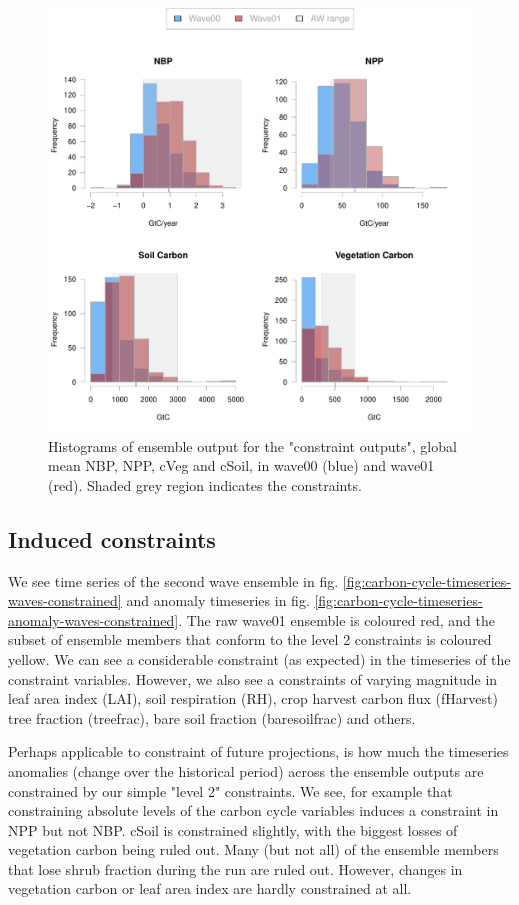 \documentclass[gmd, manuscript]{copernicus}
\begin{document}
\begin{figure}[t]
\includegraphics[width=12cm]{./figs/level_2_constraints_hists.pdf}
\caption{Histograms of ensemble output for the "constraint outputs", global mean NBP, NPP, cVeg and cSoil, in wave00 (blue) and wave01 (red). Shaded grey region indicates the constraints.}
\label{fig:level_2_constraints_hists}
\end{figure}
 
\subsection{Induced constraints}\label{ssec:induced_constraints}

We see time series of the second wave ensemble in fig. \ref{fig:carbon-cycle-timeseries-waves-constrained} and anomaly timeseries in fig. \ref{fig:carbon-cycle-timeseries-anomaly-waves-constrained}. The raw wave01 ensemble is coloured red, and the subset of ensemble members that conform to the level 2 constraints is coloured yellow. We can see a considerable constraint (as expected) in the timeseries of the constraint variables. However, we also see a constraints of varying magnitude in leaf area index (LAI), soil respiration (RH), crop harvest carbon flux (fHarvest) tree fraction (treefrac), bare soil fraction (baresoilfrac) and others.

Perhaps applicable to constraint of future projections, is how much the timeseries anomalies (change over the historical period) across the ensemble outputs are constrained by our simple "level 2" constraints. We see, for example that constraining absolute levels of the carbon cycle variables induces a constraint in NPP but not NBP. cSoil is constrained slightly, with the biggest losses of vegetation carbon being ruled out. Many (but not all) of the ensemble members that lose shrub fraction during the run are ruled out. However, changes in vegetation carbon or leaf area index are hardly constrained at all.
\end{document}
